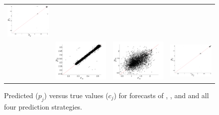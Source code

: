 \begin{figure}
\begin{tabular}{m{}|CCC}
    \includegraphics[width=0.6\columnwidth]{figs/svdfiveARIMAForecast} \\
     &
    \includegraphics[width=0.6\columnwidth]{figs/colLMAForecast} &
    \includegraphics[width=0.6\columnwidth]{figs/gccLMAForecast} &
    \includegraphics[width=0.6\columnwidth]{figs/svdfiveLMAForecast}
  \end{tabular}
  \caption{Predicted ($p_j$) versus true values ($c_j$) for forecasts of \col,
     \gcc, and \svdfive and all four prediction strategies.
  }
  \label{fig:forecast-example}
\end{figure}
